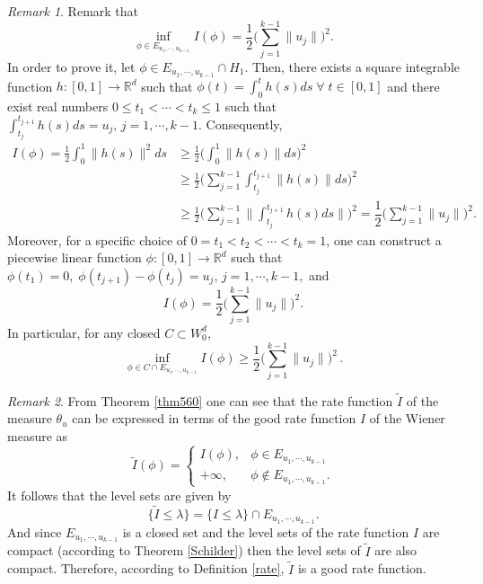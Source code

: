 \documentclass[]{interact}
\newcommand{\R}{{\mathbb{R}}}
\newcommand{\1}{\mathbf{1}}
\theoremstyle{plain}%
\theoremstyle{definition}
\theoremstyle{remark}
\newtheorem{remark}{Remark}
\begin{document}
 
 \begin{remark}
Remark that 
$$ \inf _{\phi \in  E_{u_1,\cdots,u_{k-1} }} I(\phi)  =\dfrac{1}{2}\Big( \sum_{j=1}^{k-1}\|u_j\|\Big)^2. $$
In order to prove it, let $\phi \in E_{u_1,\cdots,u_{k-1} }\cap H_1$. Then, there exists a square integrable function $h :[0,1] \to \R^d$ such  that $\phi(t)=\int_0^th(s)ds \; \forall \; t\in [0,1]$ and there exist real numbers $0\leqslant t_1<\cdots <t_k\leqslant 1$ such that $\int_{t_j}^{t_{j+1} }h(s)ds =u_j,\,j=1,\cdots,k-1$. Consequently,
\begin{align*}
I(\phi)=\frac{1}{2}\int_0^1\|h(s)\|^2ds 
&\geqslant \frac{1}{2}\Big(\int_0^1\|h(s)\|ds \Big)^2\\
&\geqslant \frac{1}{2}\Big( \sum_{j=1}^{k-1}\int_{t_j}^{t_{j+1}}\|h(s)\|ds \Big)^2\\
&\geqslant \frac{1}{2}\Big( \sum_{j=1}^{k-1} \Big\|\int_{t_j}^{t_{j+1}}h(s)ds \Big\| \Big)^2=\dfrac{1}{2}\Big( \sum_{j=1}^{k-1}\|u_j\|\Big)^2. 
\end{align*} 
Moreover, for a specific choice of $0=t_1<t_2<\cdots<t_k=1$, one can construct a piecewise linear function $\phi : [0,1]\to \R^d$ such that $\phi(t_1)=0,\;\phi(t_{j+1})-\phi(t_j)=u_j,\, j=1,\cdots,k-1,$ and 
$$ I(\phi)=\dfrac{1}{2}\Big( \sum_{j=1}^{k-1}\|u_j\|\Big)^2.  $$
\noindent In particular, for any closed $C\subset W_0^d$,
$$ \inf _{\phi \in  C\cap E_{u_1,\cdots,u_{k-1} }} I(\phi) \geqslant \dfrac{1}{2} \Big( \sum_{j=1}^{k-1}\|u_j\|\Big)^2\,. $$
\end{remark}
 


\begin{remark}
From Theorem \ref{thm560} one can see that the rate function $\widetilde{I}$ of the measure $\theta_u$ can be expressed in terms of the good rate function $I$ of the Wiener measure as 
$$\widetilde{I}(\phi)= \begin{cases} I(\phi), & \phi \in E_{u_1,\cdots,u_{k-1} } \\ +\infty, & \phi \notin E_{u_1,\cdots,u_{k-1} }.  \end{cases} $$
It follows that the level sets are given by
$$ \{ \widetilde{I} \leqslant \lambda \} = \{ I \leqslant \lambda \}\cap E_{u_1,\cdots,u_{k-1} }.  $$
And since $E_{u_1,\cdots,u_{k-1} }$ is a closed set and the level sets of the rate function $I$ are compact (according to Theorem \eqref{Schilder}) then the level sets of $\widetilde{I} $ are also compact. Therefore, according to Definition \eqref{rate}, $ \widetilde{I} $ is a good rate function.
\end{remark}
\end{document}
